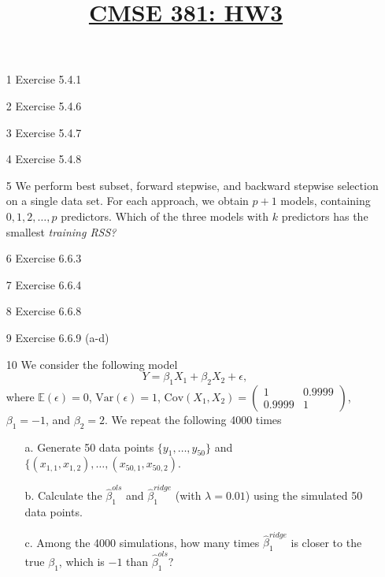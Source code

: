 \documentclass[11pt]{article}
\title{\underline{CMSE 381: HW3}}
\date{}
\newcommand{\blankline}{\quad\pagebreak[2]}
\begin{document}
\maketitle

\blankline

\begin{enumerate}
	\item[1] Exercise 5.4.1
	\item[2]  Exercise 5.4.6
	\item[3]  Exercise 5.4.7
	\item[4] Exercise 5.4.8
	\item[5]We perform best subset, forward stepwise, and backward stepwise selection on a single data set. For each approach, we obtain $p + 1$ models, containing $0, 1, 2, \ldots, p$ predictors. Which of the three models with $k$ predictors has the smallest \textit{training RSS?}
	\item[6]  Exercise 6.6.3
	\item[7] Exercise 6.6.4
	\item[8] Exercise 6.6.8
	\item[9] Exercise 6.6.9 (a-d)
	\item[10] We consider the following model
	$$ Y = \beta_1 X_1 + \beta_2 X_2 + \epsilon, $$
	where $\mathbb{E}(\epsilon) = 0$, $\text{Var}(\epsilon) = 1$, 
	$\text{Cov}(X_1, X_2) = \begin{pmatrix}  1 & 0.9999 \\ 0.9999 & 1        \end{pmatrix}$, $\beta_1 = -1$, and $\beta_2 = 2$. We repeat the following 4000 times
	\begin{itemize}
		\item[a.] Generate 50 data points $\{  y_1, \ldots, y_{50} \}$ and $\{ (x_{1, 1}, x_{1, 2} ), \ldots, (x_{50, 1}, x_{50, 2}) $.
		\item[b.] Calculate the $\hat{\beta}^{ols}_1$ and $\hat{\beta}^{ridge}_1$ (with $\lambda = 0.01$) using the simulated 50 data points.
		\item[c.] Among the 4000 simulations, how many times  $\hat{\beta}^{ridge}_1$ is closer to the true $\beta_1$, which is $-1$ than  $\hat{\beta}^{ols}_1$?
		
	\end{itemize}
	

\end{enumerate}
\end{document}

